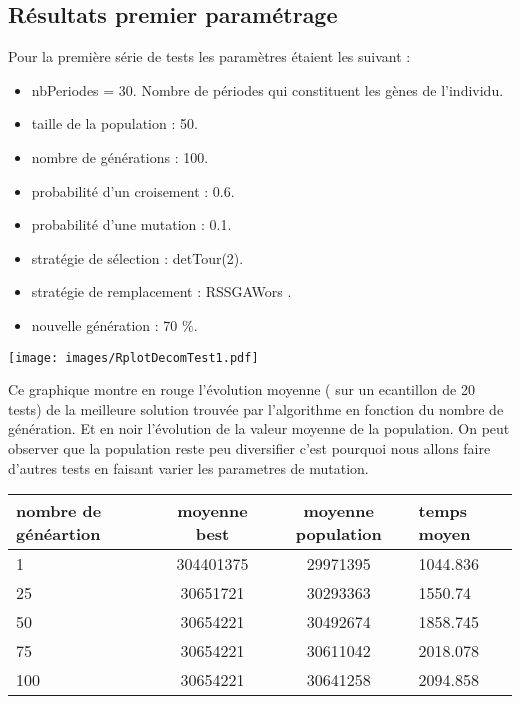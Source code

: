 \documentclass[a4paper]{report}
\begin{document}
\subsection{Résultats premier paramétrage}
Pour la première série de tests les paramètres étaient les suivant :\\

\begin{itemize}
\item nbPeriodes = 30. Nombre de périodes qui constituent les gènes de l'individu.
\item taille de la population : 50.
\item nombre de générations : 100.
\item probabilité d'un croisement : 0.6.
\item probabilité d'une mutation : 0.1.
\item stratégie de sélection : detTour(2).
\item stratégie de remplacement : RSSGAWors .
\item nouvelle génération : 70 $\%$.

\end{itemize}
\begin{center}
\texttt{[image: images/RplotDecomTest1.pdf]}
\end{center}
Ce graphique montre en rouge l'évolution moyenne ( sur un ecantillon de 20 tests) de la  meilleure solution trouvée par l'algorithme en fonction du nombre de génération. Et en noir l'évolution de la valeur moyenne de la population. On peut observer que la population reste peu diversifier c'est pourquoi nous allons faire d'autres tests en faisant varier les parametres de mutation.\\
\begin{tabular}{|l|c|c|l|}
  \hline
  nombre de généartion &moyenne best &moyenne population&temps moyen\\

  \hline
 1 & 304401375&29971395&1044.836\\
  \hline
25 & 30651721 & 30293363&  1550.74
\\
  \hline
  50& 30654221&30492674&1858.745
\\
  \hline
  75 &30654221&30611042&2018.078

\\
  \hline
 100 &  30654221&30641258&2094.858 \\
  \hline


\end{tabular}
\end{document}
